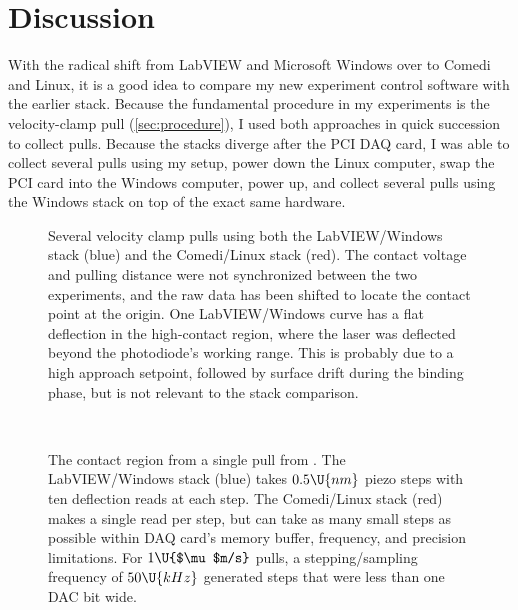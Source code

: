 \section{Discussion}
\label{sec:pyafm:discussion}

With the radical shift from LabVIEW and Microsoft Windows over to
Comedi and Linux, it is a good idea to compare my new experiment
control software with the earlier stack.  Because the fundamental
procedure in my experiments is the velocity-clamp pull
(\cref{sec:procedure}), I used both approaches in quick succession to
collect pulls.  Because the stacks diverge after the PCI DAQ card, I
was able to collect several pulls using my setup, power down the Linux
computer, swap the PCI card into the Windows computer, power up, and
collect several pulls using the Windows stack on top of the exact same
hardware.

\begin{figure}
  \begin{center}
    \caption{\protect{}Several
      velocity clamp pulls using both the LabVIEW/Windows stack (blue)
      and the Comedi/Linux stack (red).  The contact voltage and
      pulling distance were not synchronized between the two
      experiments, and the raw data has been shifted to locate the
      contact point at the origin.  One LabVIEW/Windows curve has a
      flat deflection in the high-contact region, where the laser was
      deflected beyond the photodiode's working range.  This is
      probably due to a high approach setpoint, followed by surface
      drift during the binding phase, but is not relevant to the
      stack comparison.\label{fig:pyafm:labview-comparison}}
  \end{center}
\end{figure}

\begin{figure}
  \ContinuedFloat
  \begin{center}
     \\
    \caption{\protect{}The
      contact region from a single pull from
      \protect{}.  The
      LabVIEW/Windows stack (blue) takes $0.5\U{nm}$ piezo steps with
      ten deflection reads at each step.  The Comedi/Linux stack (red)
      makes a single read per step, but can take as many small steps
      as possible within DAQ card's memory buffer, frequency, and
      precision limitations.  For $1\U{$\mu$m/s}$ pulls, a
      stepping/sampling frequency of $50\U{kHz}$ generated steps that
      were less than one DAC bit wide.}
  \end{center}
\end{figure}

